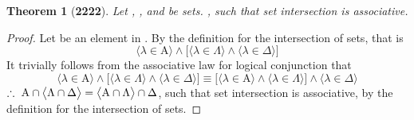 \documentclass[preview]{standalone}
\newtheorem*{theorem*}{Theorem}
\begin{document}
\begin{theorem*}[\textbf{2222}] \color{black}
    Let , \bm{$\Lambda$}, and \bm{$\Delta$} be sets. 
    , 
    such that set intersection is associative.
\end{theorem*}
\begin{proof} \color{black}
    Let \bm{$\lambda$} be an element in 
    . 
    By the definition for the intersection of sets, that is 
    \begin{equation*}
        \Big \langle \lambda \in \mathrm{A} \Big \rangle
            \land
        \bigg[
            \Big \langle \lambda \in \Lambda \Big \rangle
                \land
            \Big \langle \lambda \in \Delta \Big \rangle
        \bigg]
    \end{equation*}
    It trivially follows from the associative law for logical conjunction that
    \begin{equation*}
        \Big \langle \lambda \in \mathrm{A} \Big \rangle
            \land
        \bigg[
            \Big \langle \lambda \in \Lambda \Big \rangle
                \land
            \Big \langle \lambda \in \Delta \Big \rangle
        \bigg]
            \equiv
        \bigg[
            \Big \langle \lambda \in \mathrm{A} \Big \rangle
                \land
            \Big \langle \lambda \in \Lambda \Big \rangle
        \bigg]
            \land
        \Big \langle \lambda \in \Delta \Big \rangle
    \end{equation*}
    $
    \therefore \text{\space} \relax{
    \mathrm{A} 
        \cap 
    \big \langle \Lambda \cap \Delta \big \rangle 
        = 
    \big \langle \mathrm{A} \cap \Lambda \big \rangle
        \cap 
    \Delta
    }$,
    such that set intersection is associative,
    by the definition for the intersection of sets.
\color{lightgray} \end{proof}
\end{document}
